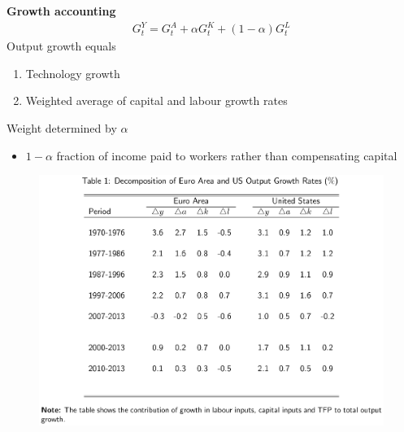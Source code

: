\documentclass{beamer}
\begin{document}
\begin{frame}
  \textbf{Growth accounting}
  \begin{align}
    G_t^Y=G_t^A + \alpha G_t^K + (1-\alpha)G_t^L
  \end{align}  
  \medskip
  Output growth equals
  \begin{enumerate}
    \item Technology growth
    \item Weighted average of capital and labour growth rates
  \end{enumerate}
  \medskip
  Weight determined by $\alpha$  
  \begin{itemize}    
    \item $1-\alpha$ fraction of income paid to workers rather than compensating capital
  \end{itemize}
\end{frame}

\begin{frame}
  \begin{figure}
    \includegraphics[scale=.7]{growth_accounting1.eps}
  \end{figure}
\end{frame}
\end{document}
